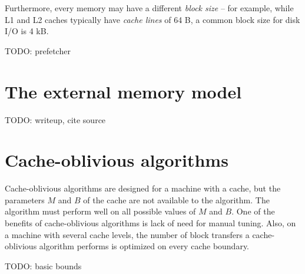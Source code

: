 Furthermore, every memory may have a different \textit{block size} -- for example,
while L1 and L2 caches typically have \textit{cache lines} of 64 B, a common
block size for disk I/O is 4 kB.

TODO: prefetcher

\section{The external memory model}
TODO: writeup, cite source

\section{Cache-oblivious algorithms}
Cache-oblivious algorithms are designed for a machine with a cache, but
the parameters $M$ and $B$ of the cache are not available to the algorithm.
The algorithm must perform well on all possible values of $M$ and $B$.
One of the benefits of cache-oblivious algorithms is lack of need for manual
tuning. Also, on a machine with several cache levels, the number of block transfers
a cache-oblivious algorithm performs is optimized on every cache boundary.

TODO: basic bounds

